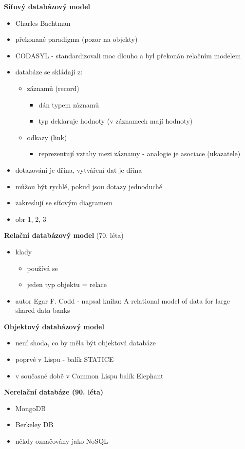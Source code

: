 \documentclass[10pt, a4paper, titlepage]{article}
\theoremstyle{note}
\begin{document}
\textbf{Síťový databázový model}
\begin{itemize}
	\item Charles Bachtman
	\item překonané paradigma (pozor na objekty)
	\item CODASYL - standardizovali moc dlouho a byl překonán relačním modelem
	\item databáze se skládají z:
	\begin{itemize}
		\item záznamů (record)
		\begin{itemize}
			\item dán typem záznamů
			\item typ deklaruje hodnoty (v záznamech mají hodnoty)
		\end{itemize}
		\item odkazy (link)
		\begin{itemize}
			\item reprezentují vztahy mezi záznamy - analogie je asociace (ukazatele)
		\end{itemize}
	\end{itemize}
	\item dotazování je dřina, vytváření dat je dřina
	\item můžou být rychlé, pokud jsou dotazy jednoduché
	\item zakreslují se síťovým diagramem
	\item  obr 1, 2, 3
\end{itemize}


\textbf{Relační databázový model} (70. léta)
\begin{itemize}
	\item klady
	\begin{itemize}
		\item používá se
		\item jeden typ objektu = relace
	\end{itemize}
	\item autor Egar F. Codd - napsal knihu:  A relational model of data for large shared data banks
\end{itemize}

\textbf{Objektový databázový model}
\begin{itemize}
	\item není shoda, co by měla být objektová databáze
	\item poprvé v Lispu - balík STATICE
	\item v současné době v Common Lispu balík Elephant
\end{itemize}

\textbf{Nerelační databáze (90. léta)}
\begin{itemize}
	\item MongoDB
	\item Berkeley DB
	\item někdy označovány jako NoSQL
\end{itemize}

\renewcommand{\indexcolumns}{3}
\printindex
\end{document}
